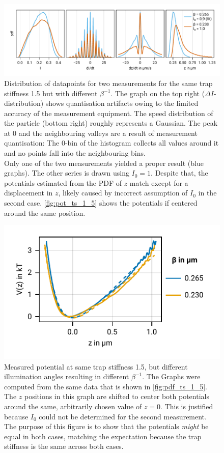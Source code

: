 \documentclass[
    twoside=false,
    twocolumn=true,
    fontsize=11pt,
]{scrarticle}
\begin{document}
\begin{figure}
    \centering
    \includegraphics{figures/02_04_02_hist.pdf}
    \caption{Distribution of datapoints for two measurements for the same trap stiffness \SI{1.5}{} but with different $\beta^{-1}$. The graph on the top right ($\Delta I$-distribution) shows quantisation artifacts owing to the limited accuracy of the measurement equipment. The speed distribution of the particle (bottom right) roughly represents a Gaussian. The peak at $0$ and the neighbouring valleys are a result of measurement quantisation: The $0$-bin of the histogram collects all values around it and no points fall into the neighbouring bins.\\
    Only one of the two measurements yielded a proper result (blue graphs). The other series is drawn using $I_0 = 1$. Despite that, the potentials estimated from the PDF of $z$ match except for a displacement in $z$, likely caused by incorrect assumption of $I_0$ in the second case. \autoref{fig:pot_ts_1_5} shows the potentials if centered around the same position.}
    \label{fig:pdf_ts_1_5}
\end{figure}
\begin{figure}
    \centering
    \includegraphics{figures/02_06_01_different_beta.pdf}
    \caption{Measured potential at same trap stiffness \SI{1.5}{}, but different illumination angles resulting in different $\beta^{-1}$. The Graphs were computed from the same data that is shown in \autoref{fig:pdf_ts_1_5}. The $z$ positions in this graph are shifted to center both potentials around the same, arbitrarily chosen value of $z=0$. This is justified because $I_0$ could not be determined for the second measurement. The purpose of this figure is to show that the potentials \textit{might} be equal in both cases, matching the expectation because the trap stiffness is the same across both cases.}
    \label{fig:pot_ts_1_5}
\end{figure}
\end{document}
